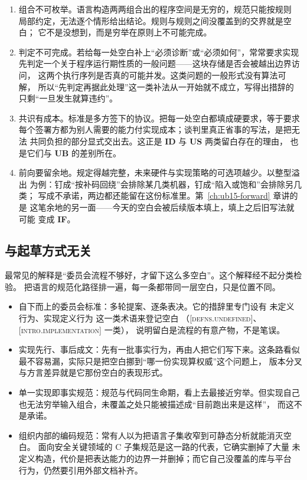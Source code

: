 \documentclass[12pt,a4paper,fontset=fandol]{ctexbook}
\newcommand{\Lang}[1]{\textsf{#1}}
\newcommand{\CL}{\Lang{C}}
\newcommand{\UB}{\textbf{\textsf{UB}}}
\newcommand{\IDB}{\textbf{\textsf{ID}}}
\newcommand{\USB}{\textbf{\textsf{US}}}
\newcommand{\ILLF}{\textbf{\textsf{IF}}}
\newcommand{\Std}[1]{\textsc{[#1]}}
\newcommand{\Clause}[1]{\textsc{\small #1}}
\begin{document}
\begin{enumerate}
  \item 组合不可枚举。语言构造两两组合出的程序空间是无穷的，规范只能按规则
        局部约定，无法逐个情形给出结论。规则与规则之间没覆盖到的交界就是空白；
        它不是没想到，而是穷举在原则上不可能完成。
  \item 判定不可完成。若给每一处空白补上“必须诊断”或“必须如何”，常常要求实现
        先判定一个关于程序运行期性质的一般问题——这块存储是否会被越出边界访问，
        这两个执行序列是否真的可能并发。这类问题的一般形式没有算法可解，
        所以“先判定再据此处理”这一类补法从一开始就不成立，写得出措辞的
        只剩“一旦发生就算违约”。
  \item 共识有成本。标准是多方签下的协议。把每一处空白都填成硬要求，等于要求
        每个签署方都为别人需要的能力付实现成本；谈判里真正省事的写法，是把无法
        共同负担的部分显式交出去。这正是 \IDB{} 与 \USB{} 两类留白存在的理由，
        也是它们与 \UB{} 的差别所在。
  \item 前向要留余地。规定得越完整，未来硬件与实现策略的可选项越少。以整型溢出
        为例：钉成“按补码回绕”会排除某几类机器，钉成“陷入或饱和”会排除另几类；
        写成不承诺，两边都还能留在这份标准里。第~\ref{ch:ub15-forward} 章讲的是
        这笔余地的另一面——今天的空白会被后续版本填上，填上之后旧写法就可能
        变成 \ILLF{}。
\end{enumerate}

\subsection{与起草方式无关}\label{sec:ub02-blank-not-drafting}

最常见的解释是“委员会流程不够好，才留下这么多空白”。这个解释经不起分类检验。
把语言的规范化路径排一遍，每一条都带同一层空白，只是位置不同。

\begin{itemize}
  \item 自下而上的委员会标准：多轮提案、逐条表决。它的措辞里专门设有
        \Clause{未定义行为}、\Clause{实现定义行为} 这一类术语来登记空白
        （\Std{defns.undefined}、\Std{intro.implementation} 一类），
        说明留白是流程的有意产物，不是笔误。
  \item 实现先行、事后成文：先有一批事实行为，再由人把它们写下来。这条路看似
        最不容易漏，实际只是把空白挪到“哪一份实现算权威”这个问题上，
        版本分叉与方言差异就是它那份空白的表现形式。
  \item 单一实现即事实规范：规范与代码同生命期，看上去最接近穷举。但实现自己
        也无法穷举输入组合，未覆盖之处只能被描述成“目前跑出来是这样”，
        而这不是承诺。
  \item 组织内部的编码规范：常有人以为把语言子集收窄到可静态分析就能消灭空白。
        面向安全关键领域的 \CL{} 子集规范是这一路的代表，它确实删掉了大量
        未定义构造，代价是把表达能力的边界一并删掉；而它自己没覆盖的库与平台
        行为，仍然要引用外部文档补齐。
\end{itemize}
\end{document}
